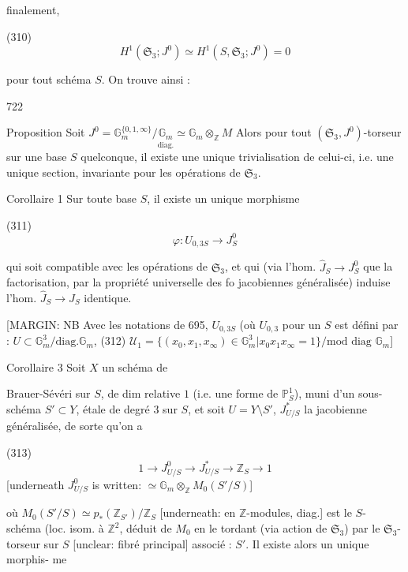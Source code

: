 finalement,

(310) $$H^1(\mathfrak{S}_3 ; J^0) \simeq H^1(S, \mathfrak{S}_3 ; J^0) = 0$$

pour tout schéma $S$. On trouve ainsi :

\newpage


722

Proposition Soit $J^0 = \mathbb{G}_m^{\{0,1,\infty\}} / \underset{\text{diag.}}{\mathbb{G}_m} \simeq \mathbb{G}_m \otimes_\mathbb{Z} M$
Alors pour tout $(\mathfrak{S}_3, J^0)$-torseur sur
une base $S$ quelconque, il existe une
unique trivialisation de celui-ci, i.e.
une unique section, invariante pour les
opérations de $\mathfrak{S}_3$.

Corollaire 1 Sur toute base $S$, il existe
un unique morphisme

(311) $$ \varphi: U_{0,3 S} \longrightarrow J^0_S $$

qui soit compatible avec les opérations
de $\mathfrak{S}_3$, et qui (via l'hom.
$\hat{J}_S \to J^0_S$ que la factorisation, par la
propriété universelle des fo jacobiennes
généralisée) induise l'hom.
$\hat{J}_S \to \hat{J}_S$ identique.

[MARGIN: NB Avec les notations de 695, $U_{0,3S}$ (où $U_{0,3}$ pour un $S$ est défini par : $U \subset \mathbb{G}_m^3 / \text{diag.} \mathbb{G}_m$, (312) $\mathcal{U}_1 = \{(x_0,x_1,x_\infty) \in \mathbb{G}_m^3 | x_0x_1x_\infty=1\} / \text{mod diag } \mathbb{G}_m$]

Corollaire 3 Soit $X$ un schéma de

\newpage


Brauer-Sévéri sur $S$, de dim relative
$1$ (i.e. une forme de $\mathbb{P}^1_S$), muni
d'un sous-schéma $S' \subset Y$, étale de
degré $3$ sur $S$, et soit $U = Y \setminus S'$,
$J^*_{U/S}$ la jacobienne généralisée, de
sorte qu'on a

(313) $$1 \longrightarrow J^0_{U/S} \longrightarrow J^*_{U/S} \longrightarrow \mathbb{Z}_S \longrightarrow 1$$
[underneath $J^0_{U/S}$ is written: $\simeq \mathbb{G}_m \otimes_{\mathbb{Z}} M_0(S'/S)$]

où $M_0(S'/S) \simeq p_*(\mathbb{Z}_{S'})/\mathbb{Z}_S$ [underneath: en $\mathbb{Z}$-modules, diag.] est le $S$-
schéma (loc. isom. à $\mathbb{Z}^2$, déduit de
$M_0$ en le tordant (via action de $\mathfrak{S}_3$)
par le $\mathfrak{S}_3$-torseur sur $S$
[unclear: fibré principal] associé : $S'$.
Il existe alors un unique morphis-
me

